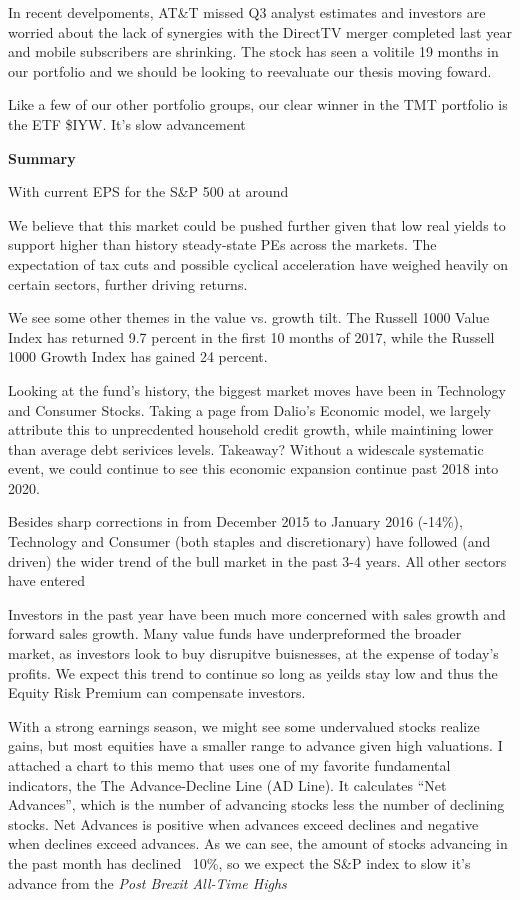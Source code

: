 \documentclass[11pt,pressrelease]{newlfm} %
\begin{document}
\begin{newlfm}
\begin{singlespace}
\begin{enumerate}
In recent develpoments, AT\&T missed Q3 analyst estimates and investors are worried about the lack of synergies with the DirectTV merger completed last year and mobile subscribers are shrinking. The stock has seen a volitile 19 months in our portfolio and we should be looking to reevaluate our thesis moving foward.

Like a few of our other portfolio groups, our clear winner in the TMT portfolio is the ETF \$IYW. It's slow advancement 


\center \textbf{Summary} \par
\raggedright
With current EPS for the S\&P 500 at around

We believe that this market could be pushed further given that low real yields to support higher than history steady-state PEs across the markets. The expectation of tax cuts and possible cyclical acceleration have weighed heavily on certain sectors, further driving returns.

We see some other themes in the value vs. growth tilt. The Russell 1000 Value Index has returned 9.7 percent in the first 10 months of 2017, while the Russell 1000 Growth Index has gained 24 percent. 

Looking at the fund's history, the biggest market moves have been in Technology and Consumer Stocks. Taking a page from Dalio's Economic model, we largely attribute this to unprecdented household credit growth, while maintining lower than average debt serivices levels. Takeaway? Without a widescale systematic event, we could continue to see this economic expansion continue past 2018 into 2020.

Besides sharp corrections in from December 2015 to January 2016 (-14\%), Technology and Consumer (both staples and discretionary) have followed (and driven) the wider trend of the bull market in the past 3-4 years. All other sectors have entered 



 Investors in the past year have been much more concerned with sales growth and forward sales growth. Many value funds have underpreformed the broader market, as investors look to buy disrupitve buisnesses,  at the expense of today's profits. We expect this trend to continue so long as yeilds stay low and thus the Equity Risk Premium can compensate investors.



With a strong earnings season, we might see some undervalued stocks realize gains, but most equities have a smaller range to advance given high valuations. I attached a chart to this memo that uses one of my favorite fundamental indicators, the The Advance-Decline Line (AD Line). It calculates ``Net Advances'', which is the number of advancing stocks less the number of declining stocks. Net Advances is positive when advances exceed declines and negative when declines exceed advances. As we can see, the amount of stocks advancing in the past month has declined ~10\%, so we expect the S\&P index to slow it's advance from the \textit{Post Brexit All-Time Highs}


\end{enumerate}
\end{singlespace}
\end{newlfm}
\end{document}
